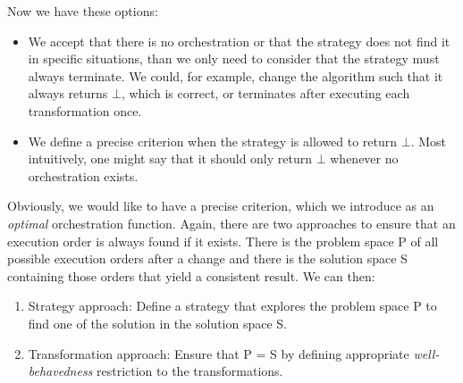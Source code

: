 Now we have these options:
\begin{itemize}
    \item We accept that there is no orchestration or that the strategy does not find it in specific situations, than we only need to consider that the strategy must always terminate.
    We could, for example, change the algorithm such that it always returns $\bot$, which is correct, or terminates after executing each transformation once.
    \item We define a precise criterion when the strategy is allowed to return $\bot$. Most intuitively, one might say that it should only return $\bot$ whenever no orchestration exists.
\end{itemize}

Obviously, we would like to have a precise criterion, which we introduce as an \emph{optimal} orchestration function.
Again, there are two approaches to ensure that an execution order is always found if it exists.
There is the problem space P of all possible execution orders after a change and there is the solution space S containing those orders that yield a consistent result. We can then:
\begin{enumerate}
    \item Strategy approach: Define a strategy that explores the problem space P to find one of the solution in the solution space S.
    \item Transformation approach: Ensure that P = S by defining appropriate \emph{well-behavedness} restriction to the transformations.
\end{enumerate}

